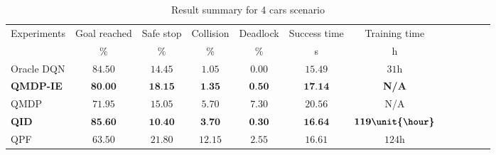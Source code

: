 \begin{table}
\caption{Result summary for 4 cars scenario}
\label{tab:results_summary}
\begin{tabularx}{\columnwidth}{@{}l*{10}{c}c@{}}
\toprule
Experiments     & Goal reached & Safe stop & Collision & Deadlock & Success time & Training time\\ 
     & $\%$ & $\%$ & $\%$ & $\%$ & s & h\\ 
\midrule
Oracle DQN    & $84.50$ & $14.45$ & $1.05$ & $0.00$ & $15.49$ & $31\unit{\hour}$ \\ %
\textbf{QMDP-IE}   & $\textbf{80.00}$ & $\textbf{18.15}$ & $\textbf{1.35}$ & $\textbf{0.50}$ & $\textbf{17.14}$ & \textbf{N/A} \\ 
QMDP      & $71.95$ & $15.05$ & $5.70$ & $7.30$ & $20.56$ & N/A\\ 
\textbf{QID}       & $\textbf{85.60}$ & $\textbf{10.40}$ & $\textbf{3.70}$ & $\textbf{0.30}$ & $\textbf{16.64}$ & $\textbf{119\unit{\hour}}$ \\ %
QPF       & $63.50$ & $21.80$ & $12.15$ & $2.55$ & $16.61$ & $124\unit{\hour}$ \\ %

\bottomrule
\end{tabularx}
\end{table}


